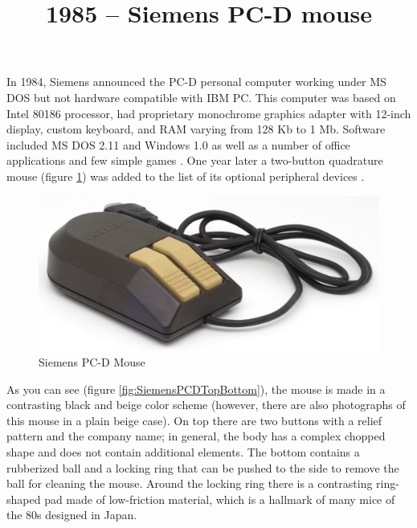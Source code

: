 \documentclass[11pt, a4paper]{article}
\begin{document}
\title{1985 -- Siemens PC-D mouse}
\date{}
\maketitle
{}
In 1984, Siemens announced the PC-D personal computer working under MS DOS but not hardware compatible with IBM PC. This computer was based on Intel 80186 processor, had proprietary monochrome graphics adapter with 12-inch display, custom keyboard, and RAM varying from 128 Kb to 1 Mb. Software included MS DOS 2.11 and Windows 1.0 as well as a number of office applications and few simple games \cite{wiki}. One year later a two-button quadrature mouse (figure \ref{fig:SiemensPCDPic}) was added to the list of its optional peripheral devices \cite{blog, pinout}.

\begin{figure}[h]
    \centering
    \includegraphics[scale=0.65]{1985_siemens_pcd_mouse/pic_30.jpg}
    \caption{Siemens PC-D Mouse}
    \label{fig:SiemensPCDPic}
\end{figure}

As you can see (figure \ref{fig:SiemensPCDTopBottom}), the mouse is made in a contrasting black and beige color scheme (however, there are also photographs of this mouse in a plain beige case). On top there are two buttons with a relief pattern and the company name; in general, the body has a complex chopped shape and does not contain additional elements. The bottom contains a rubberized ball and a locking ring that can be pushed to the side to remove the ball for cleaning the mouse. Around the locking ring there is a contrasting ring-shaped pad made of low-friction material, which is a hallmark of many mice of the 80s designed in Japan.
\end{document}
